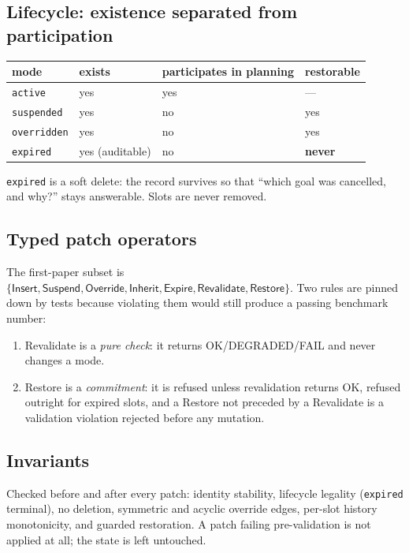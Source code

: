 \documentclass[11pt]{article}
\begin{document}
\subsection{Lifecycle: existence separated from participation}
\begin{center}
\begin{tabular}{@{}llll@{}}
\toprule
mode & exists & participates in planning & restorable\\
\midrule
\texttt{active} & yes & yes & ---\\
\texttt{suspended} & yes & no & yes\\
\texttt{overridden} & yes & no & yes\\
\texttt{expired} & yes (auditable) & no & \textbf{never}\\
\bottomrule
\end{tabular}
\end{center}
\texttt{expired} is a soft delete: the record survives so that ``which goal was
cancelled, and why?'' stays answerable. Slots are never removed.

\subsection{Typed patch operators}
The first-paper subset is
$\{\textsf{Insert},\textsf{Suspend},\textsf{Override},\textsf{Inherit},
\textsf{Expire},\textsf{Revalidate},\textsf{Restore}\}$. Two rules are pinned
down by tests because violating them would still produce a passing benchmark
number:
\begin{enumerate}[leftmargin=*]
\item \textsf{Revalidate} is a \emph{pure check}: it returns
\textsf{OK}/\textsf{DEGRADED}/\textsf{FAIL} and never changes a mode.
\item \textsf{Restore} is a \emph{commitment}: it is refused unless revalidation
returns \textsf{OK}, refused outright for expired slots, and a \textsf{Restore}
not preceded by a \textsf{Revalidate} is a validation violation rejected before
any mutation.
\end{enumerate}

\subsection{Invariants}
Checked before and after every patch: identity stability, lifecycle legality
(\texttt{expired} terminal), no deletion, symmetric and acyclic override edges,
per-slot history monotonicity, and guarded restoration. A patch failing
pre-validation is not applied at all; the state is left untouched.
\end{document}

